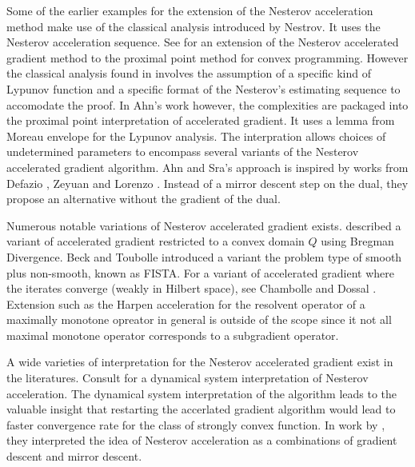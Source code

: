\documentclass[12pt]{article}
\begin{document}
    \par
    Some of the earlier examples for the extension of the Nesterov acceleration method make use of the classical analysis introduced by Nestrov. 
    It uses the Nesterov acceleration sequence. 
    See \cite{guler_new_1992} for an extension of the Nesterov accelerated gradient method to the proximal point method for convex programming. 
    However the classical analysis found in \cite[chapter 2]{nesterov_lectures_2018} involves the assumption of a specific kind of Lypunov function and a specific format of the Nesterov's estimating sequence to accomodate the proof. 
    In Ahn's work however, the complexities are packaged into the proximal point interpretation of accelerated gradient. 
    It uses a lemma from Moreau envelope for the Lypunov analysis.
    The interpration allows choices of undetermined parameters to encompass several variants of the Nesterov accelerated gradient algorithm. 
    Ahn and Sra's approach is inspired by works from Defazio \cite{defazio_curved_2019}, Zeyuan and Lorenzo \cite{allen-zhu_linear_2016}. 
    Instead of a mirror descent step on the dual, they propose an alternative without the gradient of the dual. 
    \par
    Numerous notable variations of Nesterov accelerated gradient exists. \cite[(6.1.19)]{nesterov_lectures_2018} described a variant of accelerated gradient restricted to a convex domain $Q$ using Bregman Divergence. 
    Beck and Toubolle \cite{beck_fast_2009} introduced a variant the problem type of smooth plus non-smooth, known as FISTA. 
    For a variant of accelerated gradient where the iterates converge (weakly in Hilbert space), see Chambolle and Dossal \cite{chambolle_convergence_2015}. 
    Extension such as the Harpen acceleration for the resolvent operator of a maximally monotone opreator in general is outside of the scope since it not all maximal monotone operator corresponds to a subgradient operator. 
    \par
    A wide varieties of interpretation for the Nesterov accelerated gradient exist in the literatures. 
    Consult \cite{su_differential_2015} for a dynamical system interpretation of Nesterov acceleration. 
    The dynamical system interpretation of the algorithm leads to the valuable insight that restarting the accerlated gradient algorithm would lead to faster convergence rate for the class of strongly convex function. 
    In work by \cite{allen-zhu_linear_2016}, they interpreted the idea of Nesterov acceleration as a combinations of gradient descent and mirror descent. 
\end{document}
